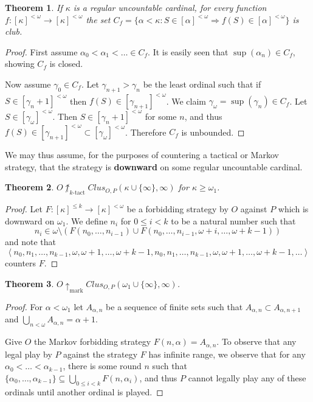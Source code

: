\documentclass[11pt]{article}
\theoremstyle{plain}
\newtheorem{theorem}{Theorem}
\theoremstyle{definition}
\theoremstyle{remark}
\newcommand{\markwin}{\uparrow_{\text{mark}}}
\newcommand{\ktactwin}[1]{\uparrow_{#1\text{-tact}}}
\newcommand{\oneptcomp}[1]{#1\cup\{\infty\}}
\newcommand{\clusgame}[2]{Clus_{O,P}(#1,#2)}
\begin{document}
\begin{theorem}
If $\kappa$ is a regular uncountable cardinal, for every function $f:[\kappa]^{<\omega}\to[\kappa]^{<\omega}$ the set $C_f = \{\alpha < \kappa : S\in[\alpha]^{<\omega} \Rightarrow f(S)\in[\alpha]^{<\omega}\}$ is club.
\end{theorem}

\begin{proof}
First assume $\alpha_0<\alpha_1<\dots\in C_f$. It is easily seen that $\sup(\alpha_n)\in C_f$, showing $C_f$ is closed.

Now assume $\gamma_0\in C_f$. Let $\gamma_{n+1}>\gamma_n$ be the least ordinal such that if $S\in[\gamma_n+1]^{<\omega}$ then $f(S)\in[\gamma_{n+1}]^{<\omega}$. We claim $\gamma_\omega = \sup(\gamma_n)\in C_f$. Let $S\in[\gamma_\omega]^{<\omega}$. Then $S\in[\gamma_n+1]^{<\omega}$ for some $n$, and thus $f(S)\in[\gamma_{n+1}]^{<\omega}\subset[\gamma_\omega]^{<\omega}$. Therefore $C_f$ is unbounded.
\end{proof}

We may thus assume, for the purposes of countering a tactical or Markov strategy, that the strategy is \textbf{downward} on some regular uncountable cardinal.

\begin{theorem}
$O\not\ktactwin{k}\clusgame{\oneptcomp{\kappa}}{\infty}$ for $\kappa\geq\omega_1$.
\end{theorem}

\begin{proof}
Let $F:[\kappa]^{\leq k} \to [\kappa]^{<\omega}$ be a forbidding strategy by $O$ against $P$ which is downward on $\omega_1$. We define $n_i$ for $0\leq i < k$ to be a natural number such that \[ n_i \in \omega \setminus(F(n_0,\dots,n_{i-1}) \cup F(n_0,\dots,n_{i-1},\omega+i,\dots,\omega+k-1))\] and note that\[\left<n_0,n_1,\dots,n_{k-1},\omega,\omega+1,\dots,\omega+k-1,n_0,n_1,\dots,n_{k-1},\omega,\omega+1,\dots,\omega+k-1,\dots\right>\] counters $F$.
\end{proof}

\begin{theorem}
$O\markwin \clusgame{\oneptcomp{\omega_1}}{\infty}$.
\end{theorem}

\begin{proof}
For $\alpha<\omega_1$ let $A_{\alpha,n}$ be a sequence of finite sets such that $A_{\alpha,n}\subset A_{\alpha,n+1}$ and $\bigcup_{n<\omega}A_{\alpha,n}=\alpha+1$.

Give $O$ the Markov forbidding strategy $F(n,\alpha)=A_{\alpha,n}$. To observe that any legal play by $P$ against the strategy $F$ has infinite range, we observe that for any $\alpha_0<\dots<\alpha_{k-1}$, there is some round $n$ such that $\{\alpha_0,\dots,\alpha_{k-1}\}\subseteq \bigcup_{0\leq i < k}F(n,\alpha_i)$, and thus $P$ cannot legally play any of these ordinals until another ordinal is played.
\end{proof}
\end{document}
